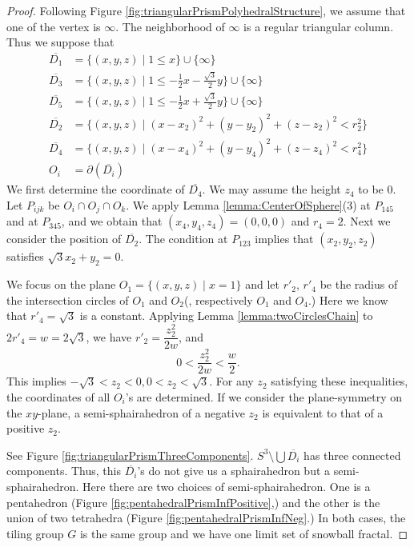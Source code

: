 \documentclass[suppldata, dvipdfmx]{interact}
\theoremstyle{plain}%
\theoremstyle{definition}
\theoremstyle{remark}
\theoremstyle{problemstyle}
\begin{document}
\begin{proof}
Following Figure \ref{fig:triangularPrismPolyhedralStructure}, we assume that one of the vertex is $\infty$.
The neighborhood of $\infty$ is a regular triangular column.  Thus we suppose that 
\begin{align*}
\overline{D_1}&= \{ (x,y,z) \mid 1 \le x \} \cup \{ \infty \}\\
\overline{D_3}&=\{(x,y,z) \mid 1 \le -\frac{1}{2}x-\frac{\sqrt{3}}{2}y \} \cup\{\infty\}\\
\overline{D_5}&=\{(x,y,z) \mid 1 \le -\frac{1}{2}x+\frac{\sqrt{3}}{2}y \} \cup\{\infty\}\\
\overline{D_2}&=\{(x,y,z) \mid (x-x_2)^2+(y-y_2)^2+(z-z_2)^2<r_2^2 \} \\
\overline{D_4}&=\{(x,y,z) \mid (x-x_4)^2+(y-y_4)^2+(z-z_4)^2<r_4^2 \} \\
O_i &= \partial(\overline{D_i})
\end{align*}
We first determine the coordinate of $\overline{D_4}$.  
We may assume the height $z_4$ to be $0$.  
Let $P_{ijk}$ be $O_i\cap O_j\cap O_k$.  
We apply Lemma \ref{lemma:CenterOfSphere}(3) at $P_{145}$ and at $P_{345}$,  and we obtain that $(x_4,y_4,z_4)=(0,0,0)$ and $r_4 = 2$.  
Next we consider the position of $\overline{D_2}$.  The condition at $P_{123}$ implies that $(x_2, y_2, z_2)$ satisfies $\sqrt{3}x_2+y_2=0$.\par
We focus on the plane $O_1=\{ (x,y,z) \mid x=1\}$ and let $r'_2$, $r'_4$ be the radius of the intersection circles of $O_1$ and $O_2$(, respectively $O_1$ and $O_4$.) 
Here we know that $r'_4=\sqrt{3}$ is a constant.  Applying Lemma \ref{lemma:twoCirclesChain} to $2r'_4=w=2\sqrt{3}$, we have $r'_2=\dfrac{z_2^2}{2w}$, and 
\[
0 < \dfrac{z_2^2}{2w} < \dfrac{w}{2}.
\] 
This implies $-\sqrt{3}<z_2<0, 0<z_2<\sqrt{3}$. For any $z_2$ satisfying these inequalities, the coordinates of all $O_i$'s are determined.  If we consider the plane-symmetry on the $xy$-plane, a semi-sphairahedron of a negative $z_2$ is equivalent to that of a positive $z_2$.  

See Figure \ref{fig:triangularPrismThreeComponents}.  $S^3\setminus \bigcup \overline{D_i}$ has three connected components.  Thus, this $\overline{D_i}$'s do not give us a sphairahedron but a semi-sphairahedron.  Here there are two choices of semi-sphairahedron.  One is a pentahedron (Figure \ref{fig:pentahedralPrismInfPositive},) and the other is the union of two tetrahedra (Figure \ref{fig:pentahedralPrismInfNeg}.)  In both cases, the tiling group $G$ is the same group and we have one limit set of snowball fractal. 
\end{proof}
\end{document}
